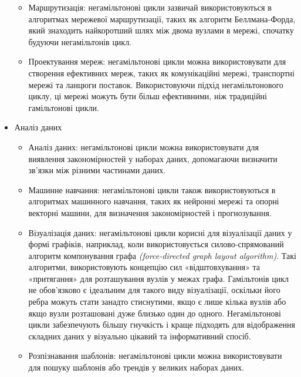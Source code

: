 \documentclass[14pt]{article}
\begin{document}
\begin{spacing}{1.175}
\begin{itemize}
\begin{itemize}
            \item Маршрутизація: негамільтонові цикли зазвичай використовуються в алгоритмах мережевої маршрутизації, таких як алгоритм Беллмана-Форда, який знаходить найкоротший шлях між двома вузлами в мережі, спочатку будуючи негамільтонів цикл.
            
            \item Проектування мереж: негамільтонові цикли можна використовувати для створення ефективних мереж, таких як комунікаційні мережі, транспортні мережі та ланцюги поставок. Використовуючи підхід негамільтонового циклу, ці мережі можуть бути більш ефективними, ніж традиційні гамільтонові цикли.
            
        \end{itemize}


        \item Аналіз даних
        \begin{itemize}
            
            \item Аналіз даних: негамільтонові цикли можна використовувати для виявлення закономірностей у наборах даних, допомагаючи визначити зв’язки між різними частинами даних.
            
            \item Машинне навчання: негамільтонові цикли також використовуються в алгоритмах машинного навчання, таких як нейронні мережі та опорні векторні машини, для визначення закономірностей і прогнозування.
                
            \item Візуалізація даних: негамільтонові цикли корисні для візуалізації даних у формі графіків, наприклад, коли використовується силово-спрямований алгоритм компонування графа \textit{(force-directed graph layout algorithm)}. Такі алгоритми, використовують концепцію сил «відштовхування» та «притягання» для розташування вузлів у межах графа. Гамільтонів цикл не обов’язково є ідеальним для такого виду візуалізації, оскільки його ребра можуть стати занадто стиснутими, якщо є лише кілька вузлів або якщо вузли розташовані дуже близько один до одного. Негамільтонові цикли забезпечують більшу гнучкість і краще підходять для відображення складних даних у візуально цікавий та інформативний спосіб.

            \item Розпізнавання шаблонів: негамільтонові цикли можна використовувати для пошуку шаблонів або трендів у великих наборах даних.
        

\end{itemize}
\end{itemize}
\end{spacing}
\end{document}
